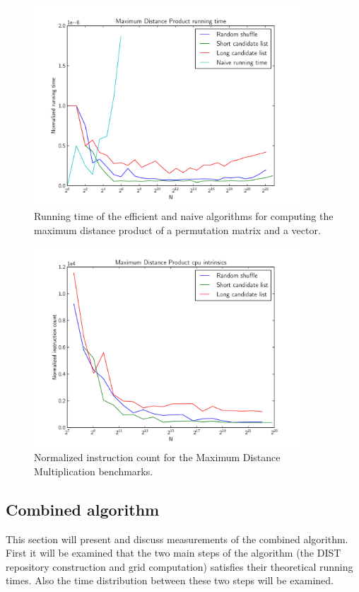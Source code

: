 \documentclass[twoside,11pt,openright]{report}
\begin{document}
\begin{figure}[h!]
  \centering
  \includegraphics[width=10cm]{distance-mult/max-dist-mult}
  \caption{Running time of the efficient and naive algorithms for computing the maximum distance product of a permutation matrix and a vector.}
  \label{fig:benchmark:max-distance}
\end{figure}

\begin{figure}[!htb]
  \centering
  \includegraphics[width=10cm]{distance-mult/max-dist-mult-cpu}
  \caption{Normalized instruction count for the Maximum Distance Multiplication benchmarks.}
  \label{fig:benchmark:max-distance-cpu}
\end{figure}

\subsection{Combined algorithm}
This section will present and discuss measurements of the combined algorithm. First it will be examined that the two main steps of the algorithm (the DIST repository construction and grid computation) satisfies their theoretical running times. Also the time distribution between these two steps will be examined.
\end{document}

